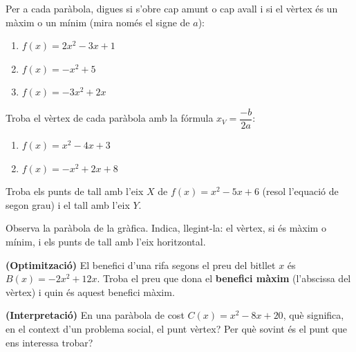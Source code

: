 \begin{exercicis}
\begin{exlist}
  \item Per a cada paràbola, digues si s'obre cap amunt o cap avall i si el vèrtex és
        un màxim o un mínim (mira només el signe de $a$):
    \begin{enumerate}[label=\alph*), leftmargin=1.6em, topsep=2pt]
      \item $f(x)=2x^2-3x+1$
      \item $f(x)=-x^2+5$
      \item $f(x)=-3x^2+2x$
    \end{enumerate}
  \item Troba el vèrtex de cada paràbola amb la fórmula $x_V=\dfrac{-b}{2a}$:
    \begin{enumerate}[label=\alph*), leftmargin=1.6em, topsep=2pt]
      \item $f(x)=x^2-4x+3$
      \item $f(x)=-x^2+2x+8$
    \end{enumerate}
  \item Troba els punts de tall amb l'eix $X$ de $f(x)=x^2-5x+6$ (resol l'equació de
        segon grau) i el tall amb l'eix $Y$.
  \item Observa la paràbola de la gràfica. Indica, llegint-la: el vèrtex, si és màxim
        o mínim, i els punts de tall amb l'eix horitzontal.

        \begin{center}

        \end{center}

  \item \textbf{(Optimització)} El benefici d'una rifa segons el preu del bitllet $x$
        és $B(x)=-2x^2+12x$. Troba el preu que dona el \textbf{benefici màxim} (l'abscissa
        del vèrtex) i quin és aquest benefici màxim.
  \item \textbf{(Interpretació)} En una paràbola de cost $C(x)=x^2-8x+20$, què
        significa, en el context d'un problema social, el punt vèrtex? Per què sovint
        és el punt que ens interessa trobar?
\end{exlist}
\end{exercicis}

